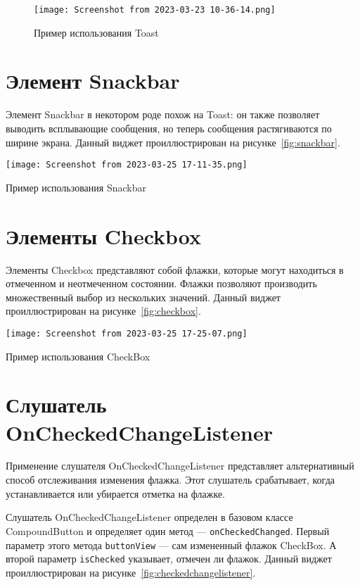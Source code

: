 \begin{figure}[h!tp]
	\centering
	\texttt{[image: Screenshot from 2023-03-23 10-36-14.png]}
	\caption{Пример использования Toast}
	\label{fig:toast}
\end{figure}

\section{Элемент Snackbar}
Элемент Snackbar в некотором роде похож на Toast: он также позволяет 
выводить всплывающие сообщения, но теперь сообщения растягиваются по 
ширине экрана.
Данный виджет проиллюстрирован на рисунке~\ref{fig:snackbar}.

\begin{image}
	\texttt{[image: Screenshot from 2023-03-25 17-11-35.png]}
	\caption{Пример использования Snackbar}
	\label{fig:snackbar}
\end{image}

\section{Элементы Checkbox}
Элементы Checkbox представляют собой флажки, которые могут 
находиться в отмеченном и неотмеченном состоянии. Флажки позволяют 
производить множественный выбор из нескольких значений.
Данный виджет проиллюстрирован на рисунке~\ref{fig:checkbox}.

\begin{image}
	\texttt{[image: Screenshot from 2023-03-25 17-25-07.png]}
	\caption{Пример использования CheckBox}
	\label{fig:checkbox}
\end{image}

\section{Слушатель OnCheckedChangeListener}
Применение слушателя OnCheckedChangeListener представляет
альтернативный способ отслеживания изменения флажка. Этот слушатель 
срабатывает, когда устанавливается или убирается отметка на флажке.\par
Слушатель OnCheckedChangeListener определен в базовом классе
CompoundButton и определяет один метод --- \texttt{onCheckedChanged}. Первый
параметр этого метода \texttt{buttonView} --- сам измененный флажок CheckBox.
А второй параметр \texttt{isChecked} указывает, отмечен ли флажок.
Данный виджет проиллюстрирован на рисунке~\ref{fig:checkedchangelistener}.

